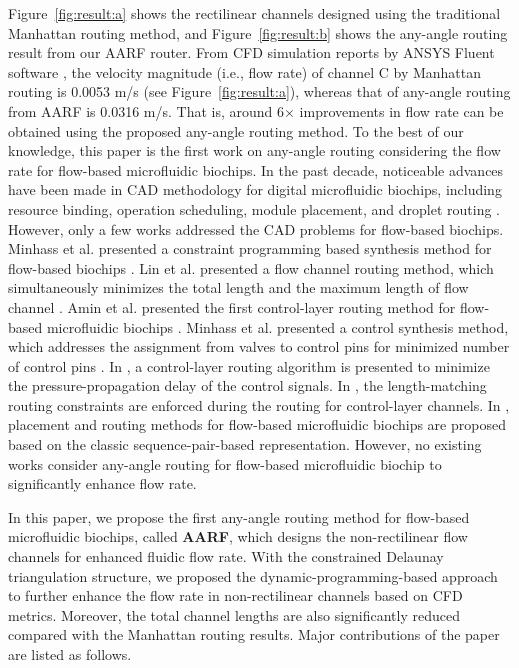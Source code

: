 \documentclass[journal]{IEEEtran}
\begin{document}
Figure~\ref{fig:result:a} shows the rectilinear channels designed using the traditional Manhattan routing method, and Figure~\ref{fig:result:b} shows the any-angle routing result from our AARF router. 
From CFD simulation reports by ANSYS Fluent software \cite{fluent}, the velocity magnitude (i.e., flow rate) of channel C by Manhattan routing is 0.0053 m/s (see Figure~\ref{fig:result:a}), whereas that of any-angle routing from AARF is 0.0316 m/s. That is, around 6$\times$ improvements in flow rate can be obtained using the proposed any-angle routing method.
To the best of our knowledge, this paper is the first work on any-angle routing considering the flow rate for flow-based microfluidic biochips. 
In the past decade, noticeable advances have been made in CAD methodology 
for digital microfluidic biochips, including
resource binding, operation scheduling, module placement, and droplet routing \cite{SU:2004ul,Cho:2008dk,SU:2005db,Yuh:2007kd,Huang:2011iy}. However, only a few works addressed the CAD problems for flow-based biochips. Minhass et al. presented 
a constraint programming based synthesis method for flow-based biochips \cite{Minhass:2012th}. Lin et al. presented a flow channel routing 
method, which simultaneously minimizes the total length and the maximum
length of flow channel \cite{Lin:2014ex}. Amin et al. presented the first control-layer 
routing method for flow-based microfluidic biochips \cite{Amin:2009eh}. 
Minhass et al. presented a control synthesis method, which addresses 
the assignment from valves to control pins for minimized number of control pins 
 \cite{Minhass:2013cm}.
In \cite{Hu:2014dt}, a control-layer routing algorithm is presented to minimize the 
pressure-propagation delay of the control signals. 
In \cite{Yao:2015}, the length-matching routing constraints are enforced during the routing for control-layer channels. 
In \cite{wq:2016}, placement and routing methods for flow-based microfluidic biochips
are proposed based on the classic sequence-pair-based representation. 
However, no existing works consider any-angle routing for flow-based microfluidic biochip to significantly enhance flow rate. 

In this paper, we propose the first any-angle routing method for flow-based microfluidic 
biochips, called {\bf AARF}, which designs the non-rectilinear flow channels for 
enhanced fluidic flow rate. With the constrained Delaunay triangulation structure, we proposed the dynamic-programming-based approach to further enhance the flow rate in non-rectilinear channels based on CFD metrics. 
Moreover, the total channel lengths are also significantly reduced compared with 
the Manhattan routing results. Major contributions of the paper are listed as follows.
\end{document}
